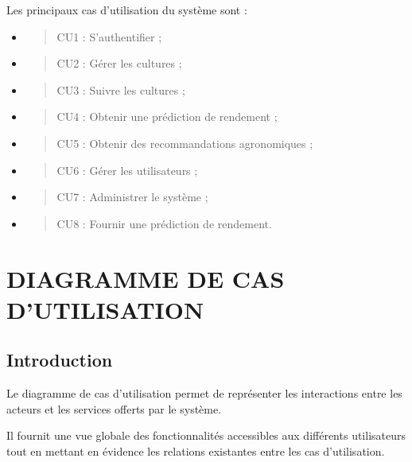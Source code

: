 Les principaux cas d'utilisation du système sont :

\begin{itemize}
\item
  \begin{quote}
  CU1 : S'authentifier ;
  \end{quote}
\item
  \begin{quote}
  CU2 : Gérer les cultures ;
  \end{quote}
\item
  \begin{quote}
  CU3 : Suivre les cultures ;
  \end{quote}
\item
  \begin{quote}
  CU4 : Obtenir une prédiction de rendement ;
  \end{quote}
\item
  \begin{quote}
  CU5 : Obtenir des recommandations agronomiques ;
  \end{quote}
\item
  \begin{quote}
  CU6 : Gérer les utilisateurs ;
  \end{quote}
\item
  \begin{quote}
  CU7 : Administrer le système ;
  \end{quote}
\item
  \begin{quote}
  CU8 : Fournir une prédiction de rendement.
  \end{quote}
\end{itemize}

\hypertarget{chapitre-5-diagramme-de-cas-dutilisation}{%
\chapter{DIAGRAMME DE CAS
D'UTILISATION}\label{chapitre-5-diagramme-de-cas-dutilisation}}

\hypertarget{introduction-2}{%
\section{Introduction}\label{introduction-2}}

Le diagramme de cas d'utilisation permet de représenter les interactions
entre les acteurs et les services offerts par le système.

Il fournit une vue globale des fonctionnalités accessibles aux
différents utilisateurs tout en mettant en évidence les relations
existantes entre les cas d'utilisation.


